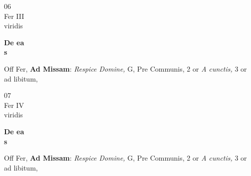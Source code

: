 \documentclass[10pt, openany]{book}
\begin{document}
        \begin{center}
            \begin{minipage}{3.5in}
                \vspace{2em}
                \begin{minipage}{0.5in}
                    {\Huge 06} \\
                    {\normalsize Fer III} \\
                    {\normalsize viridis}
                \end{minipage}
                \begin{minipage}{3.0in}
                    \textbf{ \large De ea \\
                    \textnormal{\normalsize s}} \\ 
                \end{minipage}
                \begin{justify}Off Fer, \textbf{Ad Missam}: \textit{Respice Domine,} G, Pre Communis, 2 or \textit{A cunctis,} 3 or ad libitum,  
                \end{justify}
            \end{minipage}
        \end{center}
    
        \begin{center}
            \begin{minipage}{3.5in}
                \vspace{2em}
                \begin{minipage}{0.5in}
                    {\Huge 07} \\
                    {\normalsize Fer IV} \\
                    {\normalsize viridis}
                \end{minipage}
                \begin{minipage}{3.0in}
                    \textbf{ \large De ea \\
                    \textnormal{\normalsize s}} \\ 
                \end{minipage}
                \begin{justify}Off Fer, \textbf{Ad Missam}: \textit{Respice Domine,} G, Pre Communis, 2 or \textit{A cunctis,} 3 or ad libitum,  
                \end{justify}
            \end{minipage}
        \end{center}
    
\end{document}
